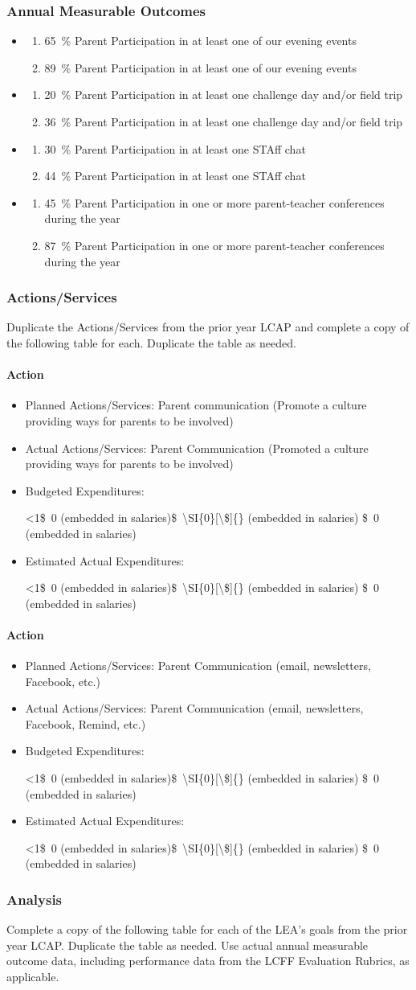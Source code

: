 \documentclass{article}
\makeatletter
\newcommand{\dollar}[1]{\SI{#1}[\$]{}}
\newcommand{\trydollar}[1]{
	\ifnum9<1#1\relax\dollar{#1}
	\else
		#1
	\fi
}
\newcounter{goal}[section] %
\newcommand*{\expact}[1]{%
	\expandafter\@expact\csname c@#1\endcsname%
}
\newcommand*{\@expact}[1]{%
	$\ifcase\intcalcAdd{1}{\intcalcMod{\intcalcSub{#1}{1}}{2}}
		\or{\text{Expected:}}
		\or{\text{Actual:}}
    \else\@ctrerr\fi$
}
\newcommand{\outcome}[2]{
	\item
	\begin{enumerate}[label=\expact*]
	\setlength{\itemsep}{0pt}
	\item #1
	\item #2
	\end{enumerate}
}
\newenvironment{outcomes}
	{
		\subsubsection{Annual Measurable Outcomes}
		\begin{itemize}[label={}]
	}
	{\end{itemize}}
\newcounter{action}[goal]
\newcommand{\actionupdate}[4]{
	\stepcounter{action}
	\paragraph{Action \theaction}
	\begin{itemize}[label={}]
		\item Planned Actions/Services: #1
		\item Actual Actions/Services: #2
		\item Budgeted Expenditures: 
			\trydollar{#3}
		\item Estimated Actual Expenditures: 
			\trydollar{#4}
	\end{itemize}
}
\makeatother
\begin{document}
\begin{outcomes}
	\outcome
	{\SI{65}{\percent} Parent Participation in at least one of our evening events}
	{\SI{89}{\percent} Parent Participation in at least one of our evening events}
	\outcome
	{\SI{20}{\percent} Parent Participation in at least one challenge day and/or field trip}
	{\SI{36}{\percent} Parent Participation in at least one challenge day and/or field trip}
	\outcome
	{\SI{30}{\percent} Parent Participation in at least one STAff chat}
	{\SI{44}{\percent} Parent Participation in at least one STAff chat}
	\outcome
	{\SI{45}{\percent} Parent Participation in one or more parent-teacher conferences during the year}
	{\SI{87}{\percent} Parent Participation in one or more parent-teacher conferences during the year}
\end{outcomes}

\subsubsection{Actions/Services}
Duplicate the Actions/Services from the prior year LCAP and complete a copy of the following table for each. Duplicate the table as needed.
\actionupdate
	{Parent communication (Promote a culture providing ways for parents to be involved)}
	{Parent Communication (Promoted a culture providing ways for parents to be involved)}
	{\dollar{0} (embedded in salaries)}
	{\dollar{0} (embedded in salaries)}

\actionupdate
	{Parent Communication (email, newsletters, Facebook, etc.)}
	{Parent Communication (email, newsletters, Facebook, Remind, etc.)}
	{\dollar{0} (embedded in salaries)}
	{\dollar{0} (embedded in salaries)}

\subsubsection{Analysis}
Complete a copy of the following table for each of the LEA's goals from the prior year LCAP. Duplicate the table as needed. Use actual annual measurable outcome data, including performance data from the LCFF Evaluation Rubrics, as applicable.
\end{document}
